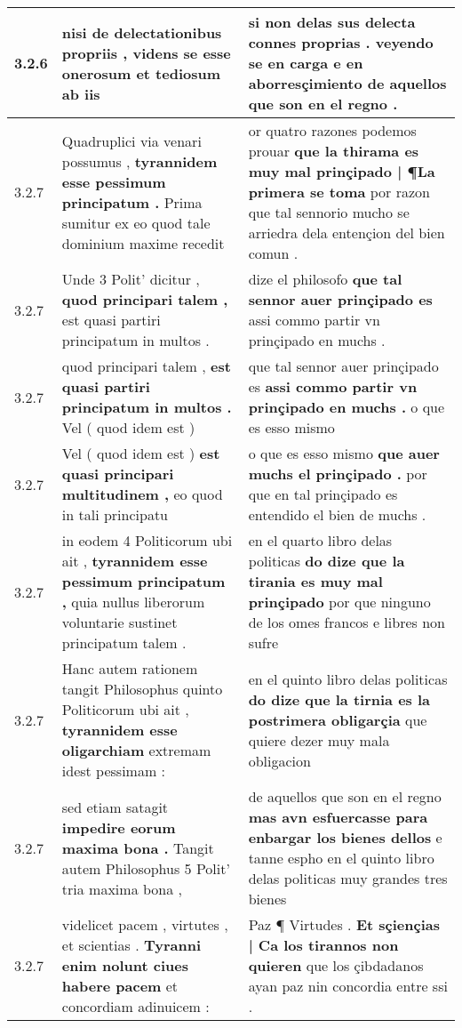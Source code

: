 \begin{tabular}{|p{1cm}|p{6.5cm}|p{6.5cm}|}
3.2.6 & nisi de delectationibus propriis , \textbf{ videns se esse onerosum et tediosum } ab iis & si non delas sus delecta connes proprias . \textbf{ veyendo se en carga e en aborresçimiento } de aquellos que son en el regno . \\\hline
3.2.7 & Quadruplici via venari possumus , \textbf{ tyrannidem esse pessimum principatum . } Prima sumitur ex eo quod tale dominium maxime recedit & or quatro razones podemos prouar \textbf{ que la thirama es muy mal prinçipado | ¶La primera se toma } por razon que tal sennorio mucho se arriedra dela entençion del bien comun . \\\hline
3.2.7 & Unde 3 Polit’ dicitur , \textbf{ quod principari talem , } est quasi partiri principatum in multos . & dize el philosofo \textbf{ que tal sennor auer prinçipado es } assi commo partir vn prinçipado en muchs . \\\hline
3.2.7 & quod principari talem , \textbf{ est quasi partiri principatum in multos . } Vel ( quod idem est ) & que tal sennor auer prinçipado es \textbf{ assi commo partir vn prinçipado en muchs . } o que es esso mismo \\\hline
3.2.7 & Vel ( quod idem est ) \textbf{ est quasi principari multitudinem , } eo quod in tali principatu & o que es esso mismo \textbf{ que auer muchs el prinçipado . } por que en tal prinçipado es entendido el bien de muchs . \\\hline
3.2.7 & in eodem 4 Politicorum ubi ait , \textbf{ tyrannidem esse pessimum principatum , } quia nullus liberorum voluntarie sustinet principatum talem . & en el quarto libro delas politicas \textbf{ do dize que la tirania es muy mal prinçipado } por que ninguno de los omes francos e libres non sufre \\\hline
3.2.7 & Hanc autem rationem tangit Philosophus quinto Politicorum ubi ait , \textbf{ tyrannidem esse oligarchiam } extremam idest pessimam : & en el quinto libro delas politicas \textbf{ do dize que la tirnia es la postrimera obligarçia } que quiere dezer muy mala obligacion \\\hline
3.2.7 & sed etiam satagit \textbf{ impedire eorum maxima bona . } Tangit autem Philosophus 5 Polit’ tria maxima bona , & de aquellos que son en el regno \textbf{ mas avn esfuercasse para enbargar los bienes dellos } e tanne espho en el quinto libro delas politicas muy grandes tres bienes \\\hline
3.2.7 & videlicet pacem , virtutes , et scientias . \textbf{ Tyranni enim nolunt ciues habere pacem } et concordiam adinuicem : & Paz ¶ Virtudes . \textbf{ Et sçiençias | Ca los tirannos non quieren } que los çibdadanos ayan paz nin concordia entre ssi . \\\hline

\end{tabular}
